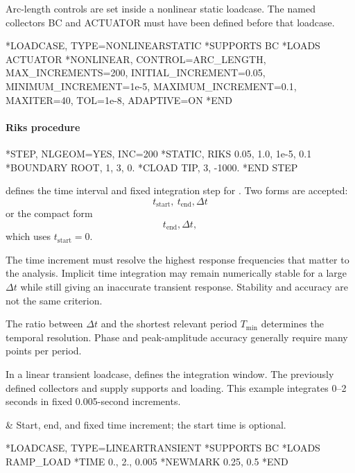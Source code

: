 Arc-length controls are set inside a nonlinear static loadcase.
The named collectors BC and ACTUATOR must have been defined
before that loadcase.

\exampleheading
\begin{inputdeck}
*LOADCASE, TYPE=NONLINEARSTATIC
*SUPPORTS
BC
*LOADS
ACTUATOR
*NONLINEAR, CONTROL=ARC_LENGTH,
 MAX_INCREMENTS=200,
 INITIAL_INCREMENT=0.05,
 MINIMUM_INCREMENT=1e-5,
 MAXIMUM_INCREMENT=0.1,
 MAXITER=40, TOL=1e-8,
 ADAPTIVE=ON
*END
\end{inputdeck}

\paragraph*{Riks procedure}
\begin{inputdeck}
*STEP, NLGEOM=YES, INC=200
*STATIC, RIKS
0.05, 1.0, 1e-5, 0.1
*BOUNDARY
ROOT, 1, 3, 0.
*CLOAD
TIP, 3, -1000.
*END STEP
\end{inputdeck}


 defines the time interval and fixed integration step for . Two forms are accepted:
\[
t_\mathrm{start},\ t_\mathrm{end},\Delta t
\]
or the compact form
\[
t_\mathrm{end},\Delta t,
\]
which uses \(t_\mathrm{start}=0\).

The time increment must resolve the highest response frequencies that matter to the analysis. Implicit time integration may remain numerically stable for a large \(\Delta t\) while still giving an inaccurate transient response. Stability and accuracy are not the same criterion.

The ratio between \(\Delta t\) and the shortest relevant period \(T_\mathrm{min}\) determines the temporal resolution. Phase and peak-amplitude accuracy generally require many points per period.

In a linear transient loadcase,  defines the integration
window. The previously defined collectors  and 
supply supports and loading. This example integrates 0--2 seconds
in fixed 0.005-second increments.

\begin{keyworddata}
 & Start, end, and fixed time increment; the start time is optional. \\
\end{keyworddata}

\exampleheading
\begin{inputdeck}
*LOADCASE, TYPE=LINEARTRANSIENT
*SUPPORTS
BC
*LOADS
RAMP_LOAD
*TIME
0., 2., 0.005
*NEWMARK
0.25, 0.5
*END
\end{inputdeck}

